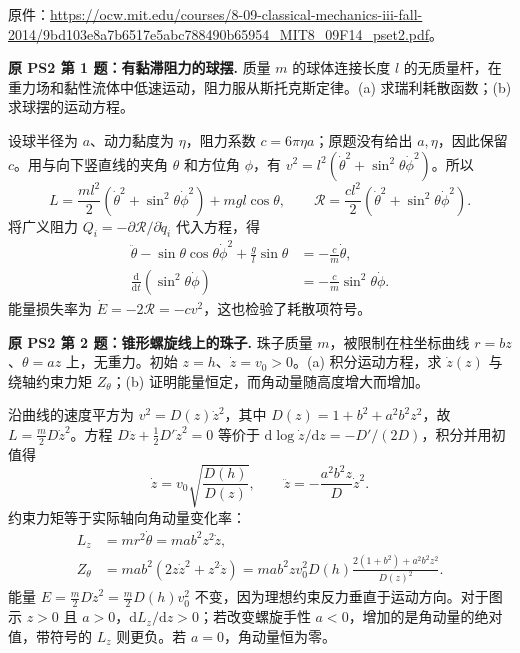 原件：\url{https://ocw.mit.edu/courses/8-09-classical-mechanics-iii-fall-2014/9bd103e8a7b6517e5abc788490b65954_MIT8_09F14_pset2.pdf}。

\begin{example}
\textbf{原 PS2 第 1 题：有黏滞阻力的球摆.} 
质量 $m$ 的球体连接长度 $l$ 的无质量杆，在重力场和黏性流体中低速运动，阻力服从斯托克斯定律。(a) 求瑞利耗散函数；(b) 求球摆的运动方程。
\end{example}
\begin{solution}
设球半径为 $a$、动力黏度为 $\eta$，阻力系数 $c=6\pi\eta a$；原题没有给出 $a,\eta$，因此保留 $c$。用与向下竖直线的夹角 $\theta$ 和方位角 $\phi$，有 $v^2=l^2(\dot\theta^2+\sin^2\theta\dot\phi^2)$。所以
\[
 L=\frac{ml^2}2(\dot\theta^2+\sin^2\theta\dot\phi^2)+mgl\cos\theta,\qquad
 \mathcal R=\frac{cl^2}2(\dot\theta^2+\sin^2\theta\dot\phi^2).
\]
将广义阻力 $Q_i=-\partial\mathcal R/\partial\dot q_i$ 代入方程，得
\begin{align*}
 \ddot\theta-\sin\theta\cos\theta\dot\phi^2+\frac gl\sin\theta&=-\frac cm\dot\theta,\\
 \frac{\mathrm d}{\mathrm dt}(\sin^2\theta\dot\phi)&=-\frac cm\sin^2\theta\dot\phi.
\end{align*}
能量损失率为 $\dot E=-2\mathcal R=-cv^2$，这也检验了耗散项符号。
\end{solution}

\begin{example}
\textbf{原 PS2 第 2 题：锥形螺旋线上的珠子.} 
珠子质量 $m$，被限制在柱坐标曲线 $r=bz$、$\theta=az$ 上，无重力。初始 $z=h$、$\dot z=v_0>0$。(a) 积分运动方程，求 $\dot z(z)$ 与绕轴约束力矩 $Z_\theta$；(b) 证明能量恒定，而角动量随高度增大而增加。
\end{example}
\begin{solution}
沿曲线的速度平方为 $v^2=D(z)\dot z^2$，其中 $D(z)=1+b^2+a^2b^2z^2$，故 $L=\frac m2D\dot z^2$。方程 $D\ddot z+\frac12D'\dot z^2=0$ 等价于 $\mathrm d\log\dot z/\mathrm dz=-D'/(2D)$，积分并用初值得
\[
 \dot z=v_0\sqrt{\frac{D(h)}{D(z)}},\qquad
 \ddot z=-\frac{a^2b^2z}{D}\dot z^2.
\]
约束力矩等于实际轴向角动量变化率：
\begin{align*}
 L_z&=mr^2\dot\theta=mab^2z^2\dot z,\\
 Z_\theta&=mab^2(2z\dot z^2+z^2\ddot z)
 =mab^2zv_0^2D(h)\frac{2(1+b^2)+a^2b^2z^2}{D(z)^2}.
\end{align*}
能量 $E=\frac m2D\dot z^2=\frac m2D(h)v_0^2$ 不变，因为理想约束反力垂直于运动方向。对于图示 $z>0$ 且 $a>0$，$\mathrm dL_z/\mathrm dz>0$；若改变螺旋手性 $a<0$，增加的是角动量的绝对值，带符号的 $L_z$ 则更负。若 $a=0$，角动量恒为零。
\end{solution}

